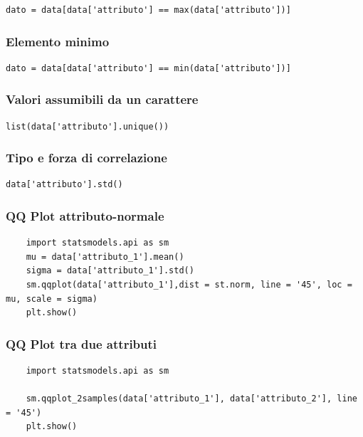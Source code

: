 \documentclass{article}
\begin{document}
\begin{lstlisting}
dato = data[data['attributo'] == max(data['attributo'])]
\end{lstlisting}

\subsubsection*{Elemento minimo}

\begin{lstlisting}
dato = data[data['attributo'] == min(data['attributo'])]
\end{lstlisting}

\subsubsection*{Valori assumibili da un carattere}

\begin{lstlisting}
list(data['attributo'].unique())
\end{lstlisting}

\subsubsection*{Tipo e forza di correlazione}

\begin{lstlisting}
data['attributo'].std()
\end{lstlisting}

\subsubsection*{QQ Plot attributo-normale}

\begin{lstlisting}
    import statsmodels.api as sm
    mu = data['attributo_1'].mean()
    sigma = data['attributo_1'].std()
    sm.qqplot(data['attributo_1'],dist = st.norm, line = '45', loc = mu, scale = sigma)
    plt.show()  
\end{lstlisting}

\subsubsection*{QQ Plot tra due attributi }

\begin{lstlisting}
    import statsmodels.api as sm 

    sm.qqplot_2samples(data['attributo_1'], data['attributo_2'], line = '45')
    plt.show()
\end{lstlisting}
\end{document}
